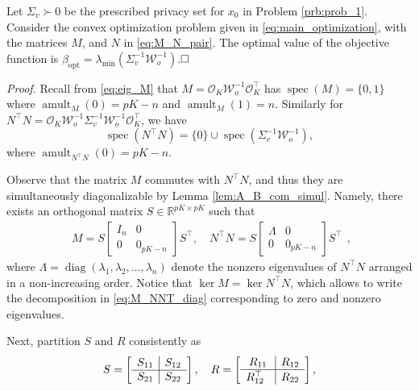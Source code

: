 \documentclass{ifacconf}
\DeclareMathOperator{\diag}{diag}
\DeclareMathOperator{\spec}{spec}
\DeclareMathOperator{\Alg}{amult}
\newcommand{\calO}{\ensuremath{\mathcal{O}}}
\newcommand{\calW}{\ensuremath{\mathcal{W}}}
\newcommand{\R}{\ensuremath{\mathbb R}}
\def\be{\begin{equation}}
\def\ee{\end{equation}}
\newcommand{\+}{\mathsmaller{+}}
\newcommand{\qedwhite}{\hfill \ensuremath{\Box}}
\begin{document}
%
\begin{thm}\label{thrm:optimization_sol}
	Let $\Sigma_v \succ 0$ be the prescribed privacy set for $x_0$ in Problem \ref{prb:prob_1}.
	Consider the convex optimization problem given in \eqref{eq:main_optimization}, with the matrices $M$, and $N$ in \eqref{eq:M_N_pair}. The optimal value of the objective function is $\beta_{\text{opt}} = \lambda_{\min}(\Sigma_v^{-1}\calW_o^{-1})$.$\qedwhite$
\end{thm}
\textit{Proof.}
	Recall from \eqref{eq:eig_M} that $M = \calO_K\calW_o^{-1} \calO_K^ \top $ has $\spec(M)=\{0,1\}$ where $\Alg_{M}(0)=pK-n$ and $\Alg_{M}(1)=n$. Similarly for $N^{\top}N = \calO_K \calW_o^{-1}\Sigma_v^{-1}\calW_o^{-1} \calO_K^ \top$, we have
	  \[ 
	  \spec(N^{\top}N)=\{0\} \cup \spec(\Sigma_v^{-1}\calW_o^{-1}),
	  \]
	 where $\Alg_{N^{\top}N}(0) = pK-n$. 
\par 
%
Observe that the matrix $M$ commutes with $N^{\top}N$, and thus they are simultaneously diagonalizable by Lemma \ref{lem:A_B_com_simul}. Namely, there 
%
%
exists an orthogonal matrix $S \in \R^{pK \times pK}$ such that   
	\be\label{eq:M_NNT_diag}
	\begin{aligned}
	M =   S\left[
		\begin{array}{c|c}
			I_n & 0 \\
			\hline
			0 & 0_{pK-n}
		\end{array}
		\right]
		S^{\top},\quad  
		 N^{\top}N =S\left[
		\begin{array}{c|c}
			\Lambda & 0 \\
			\hline
			0 & 0_{pK-n}
		\end{array}
		\right]S^{\top}
	\end{aligned},
	\ee
	where $\Lambda = \diag (\lambda_{1},\lambda_{2}, \ldots, \lambda_{n})$ denote the nonzero eigenvalues of $N^\top N$ arranged in a non-increasing order.
	Notice that $\ker M = \ker N^{\top}N$, which allows to write the decomposition in 
	\eqref{eq:M_NNT_diag} corresponding to zero and nonzero eigenvalues. 
	\par Next, 
		partition $S$ and $R$ consistently as
	\[ S =
	\left[
	\begin{array}{c|c}
	S_{11} & S_{12} \\
	\hline
	S_{21} & S_{22}
	\end{array}
	\right], \quad R = \left[
	\begin{array}{c|c}
	R_{11} & R_{12} 
	\\
	\hline
	{R}_{12}^{\top}\textcolor{white}{\hat{I}} & R_{22}
	\end{array}
	\right],
	\]
\end{document}
